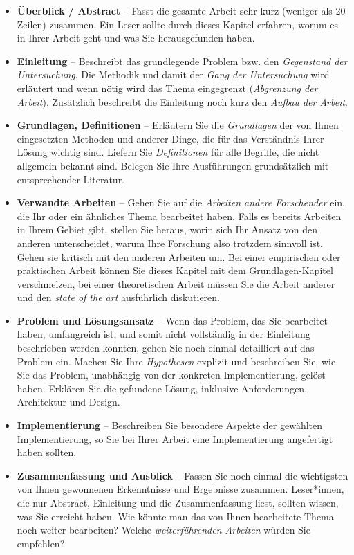 \documentclass[a4paper,11pt,headings=normal]{scrartcl}
\begin{document}
\begin{itemize}
\item \textbf{Überblick / Abstract} -- Fasst die gesamte Arbeit sehr kurz (weniger als 20 Zeilen) zusammen. Ein Leser sollte durch dieses Kapitel erfahren, worum es in Ihrer Arbeit geht und was Sie herausgefunden haben.

\item \textbf{Einleitung} -- Beschreibt das grundlegende Problem bzw. den \textit{Gegenstand der Untersuchung}. Die Methodik und damit der \textit{Gang der Untersuchung} wird erläutert und wenn nötig wird das Thema eingegrenzt (\textit{Abgrenzung der Arbeit}). Zusätzlich beschreibt die Einleitung noch kurz den \textit{Aufbau der Arbeit}.

\item \textbf{Grundlagen, Definitionen} -- Erläutern Sie die \textit{Grundlagen} der von Ihnen eingesetzten Methoden und anderer Dinge, die für das Verständnis Ihrer Lösung wichtig sind. Liefern Sie \textit{Definitionen} für alle Begriffe, die nicht allgemein bekannt sind. Belegen Sie Ihre Ausführungen grundsätzlich mit entsprechender Literatur.

\item \textbf{Verwandte Arbeiten} -- Gehen Sie auf die \textit{Arbeiten andere Forschender} ein, die Ihr oder ein ähnliches Thema bearbeitet haben. Falls es bereits Arbeiten in Ihrem Gebiet gibt, stellen Sie heraus, worin sich Ihr Ansatz von den anderen unterscheidet, warum Ihre Forschung also trotzdem sinnvoll ist. Gehen sie kritisch mit den anderen Arbeiten um. Bei einer empirischen oder praktischen Arbeit können Sie dieses Kapitel mit dem Grundlagen-Kapitel verschmelzen, bei einer theoretischen Arbeit müssen Sie die Arbeit anderer und den \textit{state of the art} ausführlich diskutieren.

\item \textbf{Problem und Lösungsansatz} -- Wenn das Problem, das Sie bearbeitet haben, umfangreich ist, und somit nicht vollständig in der Einleitung beschrieben werden konnten, gehen Sie noch einmal detailliert auf das Problem ein. Machen Sie Ihre \textit{Hypothesen} explizit und beschreiben Sie, wie Sie das Problem, unabhängig von der konkreten Implementierung, gelöst haben. Erklären Sie die gefundene Lösung, inklusive Anforderungen, Architektur und Design.

\item \textbf{Implementierung} -- Beschreiben Sie besondere Aspekte der gewählten Implementierung, so Sie bei Ihrer Arbeit eine Implementierung angefertigt haben sollten.

\item \textbf{Zusammenfassung und Ausblick} -- Fassen Sie noch einmal die wichtigsten von Ihnen gewonnenen Erkenntnisse und Ergebnisse zusammen. Leser*innen, die nur Abstract, Einleitung und die Zusammenfassung liest, sollten wissen, was Sie erreicht haben. Wie könnte man das von Ihnen bearbeitete Thema noch weiter bearbeiten? Welche \textit{weiterführenden Arbeiten} würden Sie empfehlen?
\end{itemize}
\end{document}
